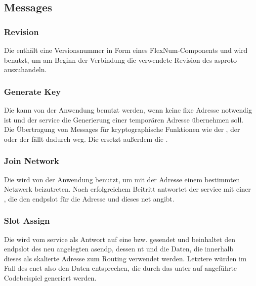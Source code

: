 \asprotobytefield

\subsection{Messages}

\subsubsection{Revision}
\label{dcl-asproto-revision}
Die \msg{\asprotorevision} enthält eine Versionsnummer in Form eines
FlexNum-Components und wird benutzt, um am Beginn der Verbindung die verwendete
Revision des \gls{asproto} auszuhandeln.

\asprotorevisionbytefield


\subsubsection{Generate Key}
\label{dcl-asproto-genkey}
Die \msg{\asprotogenkey} kann von der Anwendung benutzt werden, wenn keine fixe
Adresse notwendig ist und der \gls{service} die Generierung einer temporären
Adresse übernehmen soll. Die Übertragung von Messages für kryptographische
Funktionen wie der \msg{\asprotokeyenc}, der \msg{\asprotokeydec} oder der
\msg{\asprotocryptoresponse} fällt dadurch weg.
Die \msg{\asprotogenkey} ersetzt außerdem die \msg{\asprotoaddrpubkey}.

\asprotogenkeybytefield


\subsubsection{Join Network}
\label{dcl-asproto-joinnet}
Die \msg{\asprotojoinnet} wird von der Anwendung benutzt, um mit der Adresse
einem bestimmten Netzwerk beizutreten.
Nach erfolgreichem Beitritt antwortet der \gls{service} mit einer
\msg{\asprotoslotassign}, die den \gls{endpslot} für die Adresse und dieses
\gls{net} angibt.

\asprotojoinnetbytefield


\subsubsection{Slot Assign}
\label{dcl-asproto-slotassign}
Die \msg{\asprotoslotassign} wird vom \gls{service} als Antwort auf eine
\msg{\asprotojoinnet} bzw. \msg{\asprotojoindefnets} gesendet und beinhaltet
den \gls{endpslot} des neu angelegten \gls{asendp}, dessen \gls{nt} und die
Daten, die innerhalb dieses  als skalierte Adresse zum
Routing verwendet werden. Letztere würden im Fall des \gls{cnet} also den Daten
entsprechen, die durch das unter  auf
 angeführte Codebeispiel generiert werden.

